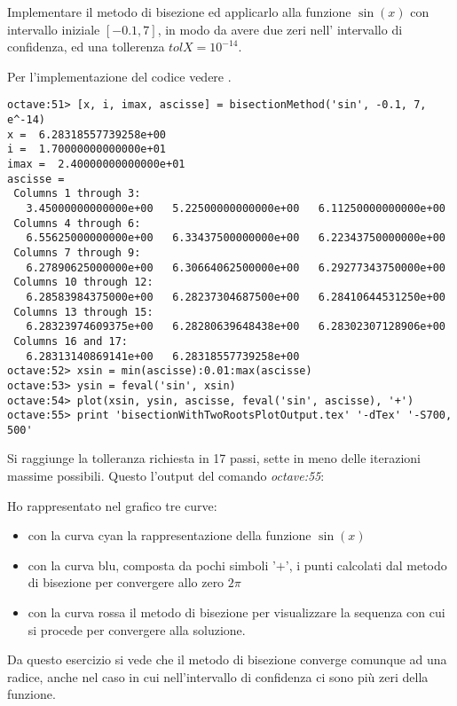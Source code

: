 \begin{exercise}
Implementare il metodo di bisezione ed applicarlo alla funzione $\sin(x)$ 
con intervallo iniziale $[-0.1, 7]$, in modo da avere due zeri nell'
intervallo di confidenza, ed una tollerenza $tolX = 10^{-14}$.
\end{exercise}
Per l'implementazione del codice vedere .
\begin{lstlisting}
octave:51> [x, i, imax, ascisse] = bisectionMethod('sin', -0.1, 7, e^-14)
x =  6.28318557739258e+00
i =  1.70000000000000e+01
imax =  2.40000000000000e+01
ascisse =
 Columns 1 through 3:
   3.45000000000000e+00   5.22500000000000e+00   6.11250000000000e+00
 Columns 4 through 6:
   6.55625000000000e+00   6.33437500000000e+00   6.22343750000000e+00
 Columns 7 through 9:
   6.27890625000000e+00   6.30664062500000e+00   6.29277343750000e+00
 Columns 10 through 12:
   6.28583984375000e+00   6.28237304687500e+00   6.28410644531250e+00
 Columns 13 through 15:
   6.28323974609375e+00   6.28280639648438e+00   6.28302307128906e+00
 Columns 16 and 17:
   6.28313140869141e+00   6.28318557739258e+00
octave:52> xsin = min(ascisse):0.01:max(ascisse)
octave:53> ysin = feval('sin', xsin)
octave:54> plot(xsin, ysin, ascisse, feval('sin', ascisse), '+')
octave:55> print 'bisectionWithTwoRootsPlotOutput.tex' '-dTex' '-S700, 500'
\end{lstlisting}
Si raggiunge la tolleranza richiesta in 17 passi, sette in meno delle iterazioni massime possibili. Questo l'output del comando \emph{octave:55}:
\begin{center}

\end{center}
Ho rappresentato nel grafico tre curve: 
\begin{itemize}
  \item con la curva cyan la rappresentazione della funzione $\sin(x)$
  \item con la curva blu, composta da pochi simboli '$+$', i punti
  calcolati dal metodo di bisezione per convergere allo zero $2\pi$
  \item con la curva rossa il metodo di bisezione per visualizzare
  la sequenza con cui si procede per convergere alla soluzione.
\end{itemize}

Da questo esercizio si vede che il metodo di bisezione converge comunque
ad una radice, anche nel caso in cui nell'intervallo di confidenza ci sono
pi\`u zeri della funzione.




